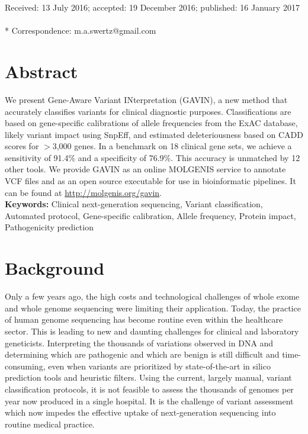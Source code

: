 \noindent
Received: 13 July 2016; accepted: 19 December 2016; published: 16 January 2017
\\~\\
* Correspondence: m.a.swertz@gmail.com

\section*{Abstract}

We present Gene-Aware Variant INterpretation (GAVIN), a new method that accurately classifies variants for clinical diagnostic purposes.
Classifications are based on gene-specific calibrations of allele frequencies from the ExAC database, likely variant impact using SnpEff, and estimated deleteriousness based on CADD scores for $>$3,000 genes.
In a benchmark on 18 clinical gene sets, we achieve a sensitivity of 91.4\% and a specificity of 76.9\%.
This accuracy is unmatched by 12 other tools.
We provide GAVIN as an online MOLGENIS service to annotate VCF files and as an open source executable for use in bioinformatic pipelines.
It can be found at \url{http://molgenis.org/gavin}.\\
\textbf{Keywords:} Clinical next-generation sequencing, Variant classification, Automated protocol, Gene-specific calibration,
Allele frequency, Protein impact, Pathogenicity prediction


\section{Background}

Only a few years ago, the high costs and technological challenges of whole exome and whole genome sequencing were limiting their application.
Today, the practice of human genome sequencing has become routine even within the healthcare sector.
This is leading to new and daunting challenges for clinical and laboratory geneticists\cite{Berg_2011}.
Interpreting the thousands of variations observed in DNA and determining which are pathogenic and which are benign is still difficult and time-consuming, even when variants are prioritized by state-of-the-art in silico prediction tools and heuristic filters\cite{Cooper_2011}.
Using the current, largely manual, variant classification protocols, it is not feasible to assess the thousands of genomes per year now produced in a single hospital.
It is the challenge of variant assessment which now impedes the effective uptake of next-generation sequencing into routine medical practice.

